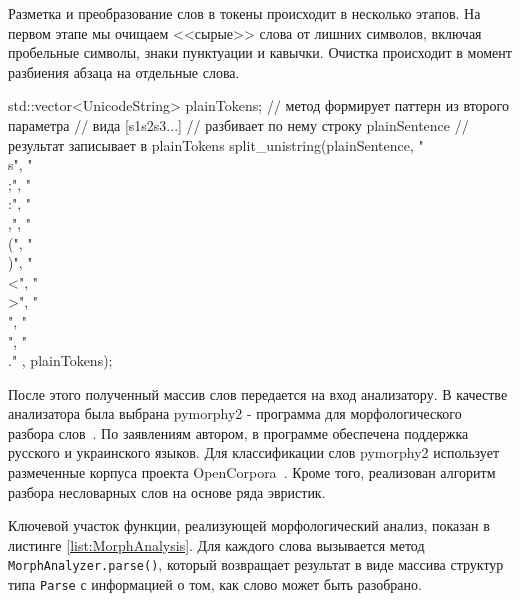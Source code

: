 Разметка и преобразование слов в токены происходит в несколько этапов. На первом этапе мы очищаем <<сырые>> слова от лишних символов, включая пробельные символы, знаки пунктуации и кавычки. Очистка происходит в момент разбиения абзаца на отдельные слова.
\begin{Verb}
std::vector<UnicodeString> plainTokens;
// метод формирует паттерн из второго параметра
// вида [s1s2s3...]
// разбивает по нему строку plainSentence
// результат записывает в plainTokens
split_unistring(plainSentence, {"\\s", "\\;", "\\:",
                                "\\,", "\\(", "\\)",
                                "\\<", "\\>", "\\{",
                                "\\}", "\\."
                                }, plainTokens);
\end{Verb}
После этого полученный массив слов передается на вход анализатору. В качестве анализатора была выбрана pymorphy2 - программа для морфологического разбора слов~\autocite{pymorphy2-home}. По заявлениям автором, в программе обеспечена поддержка русского и украинского языков. Для классификации слов pymorphy2 использует размеченные корпуса проекта OpenCorpora~\autocite{opencorpora-home}. Кроме того, реализован алгоритм разбора несловарных слов на основе ряда эвристик. 

Ключевой участок функции, реализующей морфологический анализ, показан в листинге \ref{list:MorphAnalysis}. Для каждого слова вызывается метод \lstinline{MorphAnalyzer.parse()}, который возвращает результат в виде массива структур типа \lstinline{Parse} с информацией о том, как слово может быть разобрано. 

